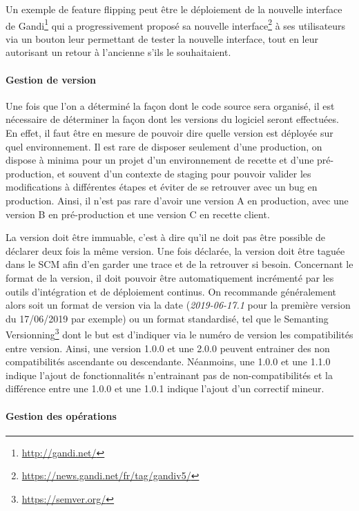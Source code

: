 Un exemple de feature flipping peut être le déploiement de la nouvelle interface de Gandi\footnote{\url{http://gandi.net/}} qui a progressivement proposé sa nouvelle interface\footnote{\url{https://news.gandi.net/fr/tag/gandiv5/}} à ses utilisateurs via un bouton leur permettant de tester la nouvelle interface, tout en leur autorisant un retour à l'ancienne s'ils le souhaitaient. 

\paragraph{Gestion de version}\label{gestion-de-version}

Une fois que l'on a déterminé la façon dont le code source sera organisé, il est nécessaire de déterminer la façon dont les versions du logiciel seront effectuées. En effet, il faut être en mesure de pouvoir dire quelle version est déployée sur quel environnement. Il est rare de disposer seulement d'une production, on dispose à minima pour un projet d'un environnement de recette et d'une pré-production, et souvent d'un contexte de staging pour pouvoir valider les modifications à différentes étapes et éviter de se retrouver avec un bug en production. Ainsi, il n'est pas rare d'avoir une version A en production, avec une version B en pré-production et une version C en recette client.

La version doit être immuable, c'est à dire qu'il ne doit pas être possible de déclarer deux fois la même version. Une fois déclarée, la version doit être taguée dans le \gls{SCM} afin d'en garder une trace et de la retrouver si besoin. Concernant le format de la version, il doit pouvoir être automatiquement incrémenté par les outils d'intégration et de déploiement continus. On recommande généralement alors soit un format de version via la date (\emph{2019-06-17.1} pour la première version du 17/06/2019 par exemple) ou un format standardisé, tel que le Semanting Versionning\footnote{\url{https://semver.org/}} dont le but est d'indiquer via le numéro de version les compatibilités entre version. Ainsi, une version 1.0.0 et une 2.0.0 peuvent entrainer des non compatibilités ascendante ou descendante. Néanmoins, une 1.0.0 et une 1.1.0 indique l'ajout de fonctionnalités n'entrainant pas de non-compatibilités et la différence entre une 1.0.0 et une 1.0.1 indique l'ajout d'un correctif mineur.

\paragraph{Gestion des opérations}

